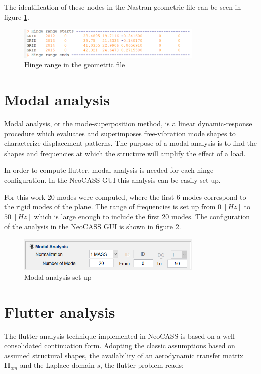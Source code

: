 \documentclass[conference]{IEEEtran}
\newlength\figureheight
\newlength\figurewidth
\begin{document}
The identification of these nodes in the Nastran geometric file can be seen in figure \ref{fig:HingeRange}.

\begin{figure}[htp]
  \centering
  \setlength\figureheight{5cm}
  \setlength\figurewidth{6cm}
  \includegraphics[width=250pt]{images/HingeRange.png}
  \caption{Hinge range in the geometric file}
  \label{fig:HingeRange}
\end{figure}


\section{Modal analysis}
Modal analysis, or the mode-superposition method, is a linear dynamic-response procedure which evaluates and superimposes free-vibration mode shapes to characterize displacement patterns. The purpose of a modal analysis is to find the shapes and frequencies at which the structure will amplify the effect of a load.

In order to compute flutter, modal analysis is needed for each hinge configuration. In the NeoCASS GUI this analysis can be easily set up.

For this work 20 modes were computed, where the first 6 modes correspond to the rigid modes of the plane. The range of frequencies is set up from $0\;[Hz]$ to $50\;[Hz]$ which is large enough to include the first 20 modes. The configuration of the analysis in the NeoCASS GUI is shown in figure \ref{fig:ModalGUI}.

\begin{figure}[htp]
  \centering
  \setlength\figureheight{5cm}
  \setlength\figurewidth{6cm}
  \includegraphics[width=250pt]{images/ModalGUI.png}
  \caption{Modal analysis set up}
  \label{fig:ModalGUI}
\end{figure}


\section{Flutter analysis}
\label{sec:flutter-analysis}
The flutter analysis technique implemented in NeoCASS is based on a well-consolidated continuation form.
Adopting the classic assumptions based on assumed structural shapes, the availability of an aerodynamic
transfer matrix $\textbf{H}_{am}$ and the Laplace domain $s$, the flutter problem reads\cite{cavagna2011aeroelastic}:
\end{document}
